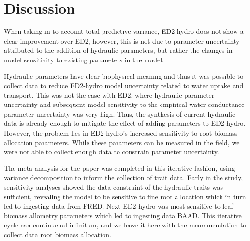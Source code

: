 \newpage
{}
\section*{Discussion}


When taking in to account total predictive variance, ED2-hydro does not show a clear improvement over ED2, however, this is not due to parameter uncertainty attributed to the addition of hydraulic parameters, but rather the changes in model sensitivity to existing parameters in the model. 

Hydraulic parameters have clear biophysical meaning and thus it was possible to collect data to reduce ED2-hydro model uncertainty related to water uptake and transport. This was not the case with ED2, where hydraulic parameter uncertainty and subsequent model sensitivity to the empirical water conductance parameter uncertainty was very high. Thus, the synthesis of current hydraulic data is already enough to mitigate the effect of adding parameters to ED2-hydro. However, the problem lies in ED2-hydro's increased sensitivity to root biomass allocation parameters. While these parameters can be measured in the field, we were not able to collect enough data to constrain parameter uncertainty. 


The meta-analysis for the paper was completed in this iterative fashion, using variance decomposition to inform the collection of trait data. Early in the study, sensitivity analyses showed the data constraint of the hydraulic traits was sufficient, revealing the model to be sensitive to fine root allocation which in turn led to ingesting data from FRED. Next ED2-hydro was most sensitive to leaf biomass allometry parameters which led to ingesting data BAAD. This iterative cycle can continue ad infinitum, and we leave it here with the recommendation to collect data root biomass allocation. 